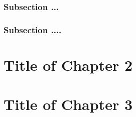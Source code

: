 \documentclass[13pt,a4paper]{extreport}
\begin{document}
\justifying
\subsection{Subsection ...}

\justifying
\subsection{Subsection ....}



\justifying
\chapter{Title of Chapter 2}





\justifying
\chapter{Title of Chapter 3}








































































\begin{appendices}
















\end{appendices}
\end{document}
